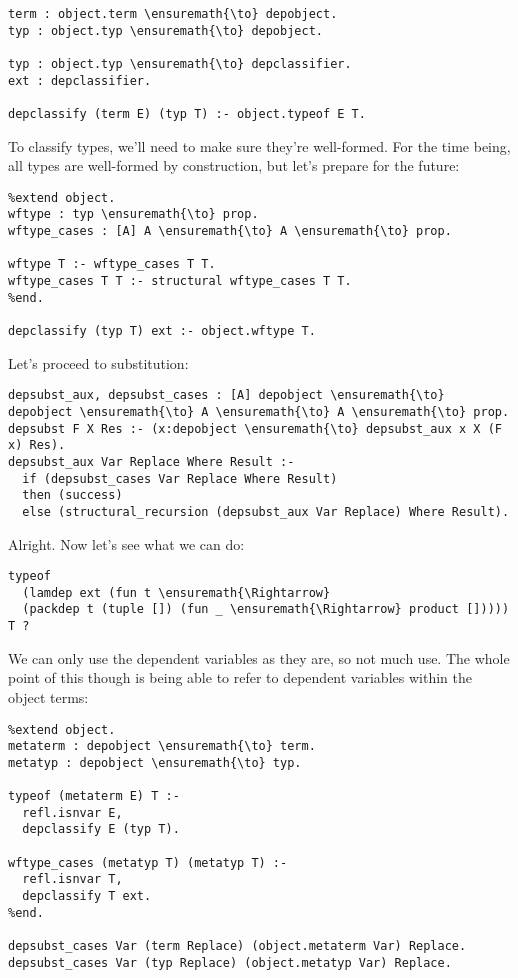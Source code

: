 \begin{verbatim}
term : object.term \ensuremath{\to} depobject.
typ : object.typ \ensuremath{\to} depobject.

typ : object.typ \ensuremath{\to} depclassifier.
ext : depclassifier.

depclassify (term E) (typ T) :- object.typeof E T.
\end{verbatim}

To classify types, we'll need to make sure they're well-formed. For the
time being, all types are well-formed by construction, but let's prepare
for the future:

\begin{verbatim}
%extend object.
wftype : typ \ensuremath{\to} prop.
wftype_cases : [A] A \ensuremath{\to} A \ensuremath{\to} prop.

wftype T :- wftype_cases T T.
wftype_cases T T :- structural wftype_cases T T.
%end.

depclassify (typ T) ext :- object.wftype T.
\end{verbatim}

Let's proceed to substitution:

\begin{verbatim}
depsubst_aux, depsubst_cases : [A] depobject \ensuremath{\to} depobject \ensuremath{\to} A \ensuremath{\to} A \ensuremath{\to} prop.
depsubst F X Res :- (x:depobject \ensuremath{\to} depsubst_aux x X (F x) Res).
depsubst_aux Var Replace Where Result :-
  if (depsubst_cases Var Replace Where Result)
  then (success)
  else (structural_recursion (depsubst_aux Var Replace) Where Result).
\end{verbatim}

Alright. Now let's see what we can do:

\begin{verbatim}
typeof
  (lamdep ext (fun t \ensuremath{\Rightarrow}
  (packdep t (tuple []) (fun _ \ensuremath{\Rightarrow} product [])))) T ?
\end{verbatim}

We can only use the dependent variables as they are, so not much use.
The whole point of this though is being able to refer to dependent
variables within the object terms:

\begin{verbatim}
%extend object.
metaterm : depobject \ensuremath{\to} term.
metatyp : depobject \ensuremath{\to} typ.

typeof (metaterm E) T :-
  refl.isnvar E,
  depclassify E (typ T).
  
wftype_cases (metatyp T) (metatyp T) :-
  refl.isnvar T,
  depclassify T ext.
%end.

depsubst_cases Var (term Replace) (object.metaterm Var) Replace.
depsubst_cases Var (typ Replace) (object.metatyp Var) Replace.
\end{verbatim}

